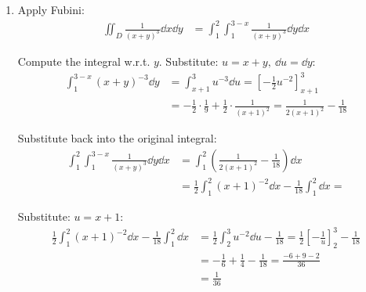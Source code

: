 \documentclass[12pt]{article}
\begin{document}
\begin{enumerate}
    \item Apply Fubini:
    $$
    \begin{aligned}
        \iint_D \frac{1}{(x + y)^3} \dd x \dd y &= \int_1^2 \int_1^{3-x} \frac{1}{(x + y)^3} \dd y \dd x
    \end{aligned}
    $$

    Compute the integral w.r.t. $y$. Substitute: $u = x + y,\ \dd u = \dd y$:
    $$
    \begin{aligned}
        \int_1^{3-x} (x + y)^{-3} \dd y &= \int_{x + 1}^{3} u^{-3} \dd u = \left[-\frac{1}{2} u^{-2}\right]_{x+1}^3 \\
        &= -\frac{1}{2} \cdot \frac{1}{9} + \frac{1}{2}\cdot\frac{1}{(x+1)^2} = \frac{1}{2(x+1)^2} - \frac{1}{18}
    \end{aligned}
    $$

    Substitute back into the original integral:
    $$
    \begin{aligned}
        \int_1^2 \int_1^{3-x} \frac{1}{(x + y)^3} \dd y \dd x &= \int_1^2 \left( \frac{1}{2(x+1)^2} - \frac{1}{18} \right) \dd x \\
        &= \frac{1}{2} \int_1^2 (x+1)^{-2} \dd x - \frac{1}{18} \int_1^2 \dd x = 
    \end{aligned}
    $$

    Substitute: $u = x + 1$:
    $$
    \begin{aligned}
        \frac{1}{2} \int_1^2 (x+1)^{-2} \dd x - \frac{1}{18} \int_1^2 \dd x &= \frac{1}{2} \int_{2}^{3} u^{-2} \dd u - \frac{1}{18} = \frac{1}{2} \left[ -\frac{1}{u} \right]_{2}^{3} - \frac{1}{18} \\
        &= -\frac{1}{6} + \frac{1}{4} -\frac{1}{18} = \frac{-6 + 9 - 2}{36} \\
        &= \boxed{\frac{1}{36}}
    \end{aligned}
    $$
\end{enumerate}
\end{document}
